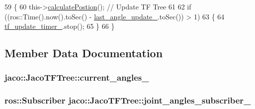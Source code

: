 \begin{DoxyCode}
59 \{
60     this->\hyperlink{classjaco_1_1JacoTFTree_a9d27ae1569454f687fdb3efc3c2718cf}{calculatePostion}();  \textcolor{comment}{// Update TF Tree}
61 
62     \textcolor{keywordflow}{if} ((ros::Time().now().toSec() - \hyperlink{classjaco_1_1JacoTFTree_a20869124ed9dd0b936d79d5d8a60b6db}{last\_angle\_update\_}.toSec()) > 1)
63     \{
64         \hyperlink{classjaco_1_1JacoTFTree_a1470ccde41ff4213c92b4e7ecbcad3e3}{tf\_update\_timer\_}.stop();
65     \}
66 \}
\end{DoxyCode}


\subsection{Member Data Documentation}
\subsubsection[{\texorpdfstring{current\+\_\+angles\+\_\+}{current_angles_}}]{ jaco\+::\+Jaco\+T\+F\+Tree\+::current\+\_\+angles\+\_\+\hspace{0.3cm}{\ttfamily [private]}}\hypertarget{classjaco_1_1JacoTFTree_a352b7d128f76d3a4f01e01ec8b416e22}{}\label{classjaco_1_1JacoTFTree_a352b7d128f76d3a4f01e01ec8b416e22}
\subsubsection[{\texorpdfstring{joint\+\_\+angles\+\_\+subscriber\+\_\+}{joint_angles_subscriber_}}]{\setlength{\rightskip}{0pt plus 5cm}ros\+::\+Subscriber jaco\+::\+Jaco\+T\+F\+Tree\+::joint\+\_\+angles\+\_\+subscriber\+\_\+\hspace{0.3cm}{\ttfamily [private]}}\hypertarget{classjaco_1_1JacoTFTree_a5908642f0eee94b14d4b4ef649e4ad0f}{}\label{classjaco_1_1JacoTFTree_a5908642f0eee94b14d4b4ef649e4ad0f}
